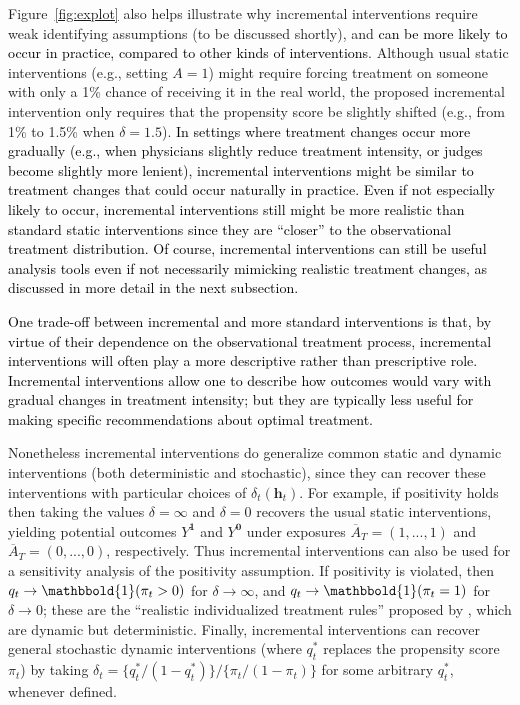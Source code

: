 \documentclass[12pt]{article}
\newcommand{\bh}{\mathbf{h}}
\newcommand{\one}{\mathbbold{1}}
\theoremstyle{remark}
\begin{document}
\vspace{-.05in}

Figure~\ref{fig:explot} also helps illustrate why incremental interventions require weak identifying assumptions (to be discussed shortly), and \textcolor{black}{can be more likely to occur in practice, compared to other kinds of interventions}. Although usual static interventions (e.g., setting $A=1$) might require forcing treatment on someone with only a 1\% chance of receiving it in the real world, the proposed incremental intervention only requires that the propensity score be slightly shifted (e.g., from 1\% to 1.5\% when $\delta=1.5$). \textcolor{black}{In settings where treatment changes occur more gradually (e.g., when physicians slightly reduce treatment intensity, or judges become slightly more lenient), incremental interventions might be similar to treatment changes that could occur naturally in practice. Even if not especially likely to occur, incremental interventions still might be more realistic than standard static interventions since they are ``closer'' to the observational treatment distribution. Of course, incremental interventions can still be useful analysis tools even if not necessarily mimicking realistic treatment changes, as discussed in more detail in the next subsection. }

\textcolor{black}{One trade-off between incremental and more standard interventions is that, by virtue of their dependence on the observational treatment process, incremental interventions will often play a more descriptive rather than prescriptive role. Incremental interventions  allow one to describe how outcomes would vary with gradual changes in treatment intensity; but they are typically less useful for making specific recommendations about optimal treatment.}


Nonetheless incremental interventions do generalize common static and dynamic interventions (both deterministic and stochastic), since they can recover these interventions with particular choices of $\delta_t(\bh_t)$. For example, if positivity holds  then taking the values $\delta=\infty$ and  $\delta=0$ recovers the usual static interventions, yielding potential outcomes $Y^\mathbf{1}$ and $Y^\mathbf{0}$ under exposures  $\overline{A}_T=(1,...,1)$ and $\overline{A}_T=(0,...,0)$, respectively. Thus incremental interventions can also be used for a sensitivity analysis of the positivity assumption. If positivity is violated, then $q_t \rightarrow \one(\pi_t>0)$ for $\delta \rightarrow \infty$, and $q_t \rightarrow \one(\pi_t=1)$ for $\delta \rightarrow 0$;  these are the ``realistic individualized treatment rules'' proposed by \textcite{van2007causal,moore2012causal}, which are dynamic but deterministic. %
Finally, incremental interventions can recover general stochastic dynamic interventions (where $q^*_t$ replaces the propensity score $\pi_t$) by taking $\delta_t =\{ q^*_t / (1-q^*_t) \} / \{ \pi_t / (1-\pi_t) \}$ for some arbitrary $q^*_t$, whenever defined.
\end{document}
